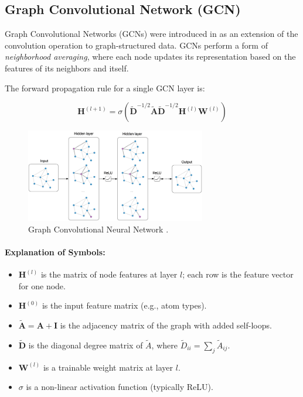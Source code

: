 \documentclass[11pt,a4paper]{article}
\begin{document}
	\subsection{Graph Convolutional Network (GCN)}
	
	Graph Convolutional Networks (GCNs) were introduced in \cite{kipf2017semi} as an extension of the convolution operation to graph-structured data. GCNs perform a form of \emph{neighborhood averaging}, where each node updates its representation based on the features of its neighbors and itself.
	
	The forward propagation rule for a single GCN layer is:
	
	\begin{equation}
		\mathbf{H}^{(l+1)} = \sigma\left( \mathbf{\tilde{D}}^{-1/2} \mathbf{\tilde{A}} \mathbf{\tilde{D}}^{-1/2} \mathbf{H}^{(l)} \mathbf{W}^{(l)} \right)
	\end{equation}
	
	\begin{figure}[h]
		\centering
		\includegraphics[width=0.7\textwidth]{gcn.png}
		\caption{Graph Convolutional Neural Network \cite{pic:gcn}.}
	\end{figure}

	\paragraph{Explanation of Symbols:}
	\begin{itemize}
		\item $\mathbf{H}^{(l)}$ is the matrix of node features at layer $l$; each row is the feature vector for one node.
		\item $\mathbf{H}^{(0)}$ is the input feature matrix (e.g., atom types).
		\item $\mathbf{\tilde{A}} = \mathbf{A} + \mathbf{I}$ is the adjacency matrix of the graph with added self-loops.
		\item $\mathbf{\tilde{D}}$ is the diagonal degree matrix of $\tilde{A}$, where $\tilde{D}_{ii} = \sum_j \tilde{A}_{ij}$.
		\item $\mathbf{W}^{(l)}$ is a trainable weight matrix at layer $l$.
		\item $\sigma$ is a non-linear activation function (typically ReLU).
	\end{itemize}
	
\end{document}
